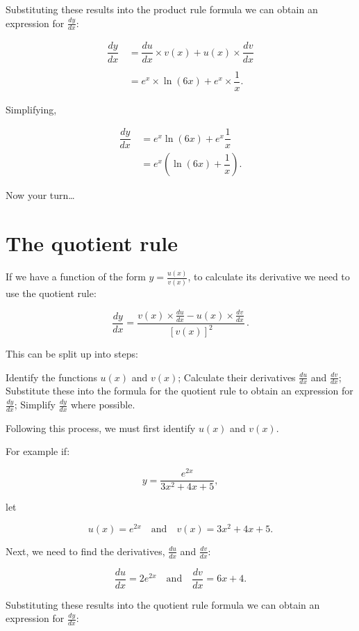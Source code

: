 \documentclass[
  a4paper,
]{scrbook}
\begin{document}
Substituting these results into the product rule formula we can obtain
an expression for \(\tfrac{dy}{dx}\):

\[
\begin{aligned}
\dfrac{dy}{dx} &\,= \dfrac{du}{dx}\times v(x) + u(x) \times\dfrac{dv}{dx} \\ \\
&\,=e^x \times\ln(6x) +e^x \times \dfrac{1}{x}. 
\end{aligned}
\]

Simplifying,

\[
\begin{aligned}
\dfrac{dy}{dx} &\,= e^x\ln(6x) +e^x \dfrac{1}{x} \\ 
&\,= e^x (\ln(6x) +\dfrac{1}{x}).
\end{aligned}
\]

Now your turn\ldots{}

\section{The quotient rule}\label{the-quotient-rule}

If we have a function of the form \(y=\tfrac{u(x)}{v(x)}\), to calculate
its derivative we need to use the quotient rule:

\[
\dfrac{dy}{dx} = \dfrac{v(x) \times \frac{du}{dx} - u(x) \times\frac{dv}{dx}}{[v(x)]^2}\,.
\]

This can be split up into steps:

Identify the functions \(u(x)\) and \(v(x)\); Calculate their
derivatives \(\tfrac{du}{dx}\) and \(\tfrac{dv}{dx}\); Substitute these
into the formula for the quotient rule to obtain an expression for
\(\tfrac{dy}{dx}\); Simplify \(\tfrac{dy}{dx}\) where possible.

Following this process, we must first identify \(u(x)\) and \(v(x)\).

For example if:

\[
y=\frac{e^{2x}}{3x^2+4x+5},
\]

let

\[
u(x) = e^{2x} \quad \text{and} \quad v(x)=3x^2+4x+5.
\]

Next, we need to find the derivatives, \(\tfrac{du}{dx}\) and
\(\tfrac{dv}{dx}\):

\[
\dfrac{du}{dx} = 2e^{2x} \quad \text{and} \quad \dfrac{dv}{dx} = 6x+4.
\]

Substituting these results into the quotient rule formula we can obtain
an expression for \(\tfrac{dy}{dx}\):
\end{document}
